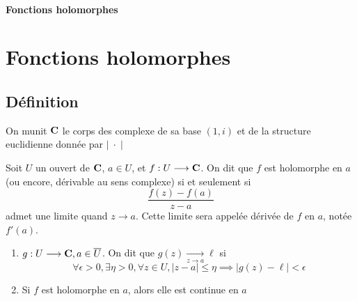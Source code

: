 \ifsolo
    ~

    \vspace{1cm}

    \begin{center}
        \textbf{\LARGE Fonctions holomorphes} \\[1em]
    \end{center}
    \tableofcontents
\else
    \chapter{Fonctions holomorphes}

    \minitoc
\fi
\thispagestyle{empty}



\section{Définition}

\begin{dfn}[Notation]
    On munit $\mathbf C$ le corps des complexe de sa base $(1, i)$ et de la structure euclidienne donnée par  $|\;\cdot\;|$
\end{dfn}

\begin{dfn}
    Soit $U$ un ouvert de $\mathbf C$, $a \in  U$, et $f:U\longrightarrow \mathbf C$. On dit que $f$ est holomorphe en  $a$ (ou encore, dérivable au sens complexe)  si et seulement si \[
        \frac{f(z)-f(a)}{z-a}
    \] 
    admet une limite quand $z\to a$. Cette limite sera appelée dérivée de $f$ en  $a$, notée  $f'(a)$.
\end{dfn}

\begin{rem}
    \begin{enumerate}[label=(\arabic*)]
    \item $g:U\longrightarrow \mathbf C, a \in \overline{U}$. On dit que $g(z)\xrightarrow[z\to a]{}\ell$ si \[\forall  \epsilon >0, \exists  \eta >0, \forall  z \in  U, |z-a|\leq \eta \implies |g(z)-\ell|<\epsilon\]
    \item Si $f$ est holomorphe en  $a$, alors elle est continue en  $a$
\end{enumerate}
\end{rem}

